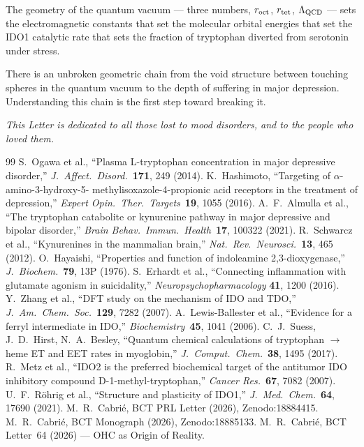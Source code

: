 \documentclass[aps,prl,preprint,superscriptaddress,floatfix]{revtex4-2}
\begin{document}
The geometry of the quantum vacuum --- three numbers, $r_{\rm oct}$,
$r_{\rm tet}$, $\Lambda_{\rm QCD}$ --- sets the electromagnetic constants
that set the molecular orbital energies that set the IDO1 catalytic rate
that sets the fraction of tryptophan diverted from serotonin under stress.

There is an unbroken geometric chain from the void structure between
touching spheres in the quantum vacuum to the depth of suffering in
major depression. Understanding this chain is the first step toward
breaking it.

\textit{This Letter is dedicated to all those lost to mood disorders,
and to the people who loved them.}

\begin{thebibliography}{99}
 S.~Ogawa et al., ``Plasma L-tryptophan concentration in
  major depressive disorder,'' \textit{J.\ Affect.\ Disord.}\ \textbf{171},
  249 (2014).
 K.~Hashimoto, ``Targeting of $\alpha$-amino-3-hydroxy-5-
  methylisoxazole-4-propionic acid receptors in the treatment of depression,''
  \textit{Expert Opin.\ Ther.\ Targets}\ \textbf{19}, 1055 (2016).
 A.~F.~Almulla et al., ``The tryptophan catabolite or
  kynurenine pathway in major depressive and bipolar disorder,''
  \textit{Brain Behav.\ Immun.\ Health}\ \textbf{17}, 100322 (2021).
 R.~Schwarcz et al., ``Kynurenines in the mammalian
  brain,'' \textit{Nat.\ Rev.\ Neurosci.}\ \textbf{13}, 465 (2012).
 O.~Hayaishi, ``Properties and function of indoleamine
  2,3-dioxygenase,'' \textit{J.\ Biochem.}\ \textbf{79}, 13P (1976).
 S.~Erhardt et al., ``Connecting inflammation with
  glutamate agonism in suicidality,'' \textit{Neuropsychopharmacology}
  \textbf{41}, 1200 (2016).
 Y.~Zhang et al., ``DFT study on the mechanism of IDO
  and TDO,'' \textit{J.\ Am.\ Chem.\ Soc.}\ \textbf{129}, 7282 (2007).
 A.~Lewis-Ballester et al., ``Evidence for a ferryl
  intermediate in IDO,'' \textit{Biochemistry}\ \textbf{45}, 1041 (2006).
 C.~J.~Suess, J.~D.~Hirst, N.~A.~Besley, ``Quantum
  chemical calculations of tryptophan $\to$ heme ET and EET rates in
  myoglobin,'' \textit{J.\ Comput.\ Chem.}\ \textbf{38}, 1495 (2017).
 R.~Metz et al., ``IDO2 is the preferred biochemical
  target of the antitumor IDO inhibitory compound D-1-methyl-tryptophan,''
  \textit{Cancer Res.}\ \textbf{67}, 7082 (2007).
 U.~F.~R\"ohrig et al., ``Structure and plasticity of
  IDO1,'' \textit{J.\ Med.\ Chem.}\ \textbf{64}, 17690 (2021).
 M.~R.~Cabri\'e, BCT PRL Letter (2026), Zenodo:18884415.
 M.~R.~Cabri\'e, BCT Monograph (2026), Zenodo:18885133.
 M.~R.~Cabri\'e, BCT Letter~64 (2026) --- OHC as Origin
  of Reality.
\end{thebibliography}
\end{document}
